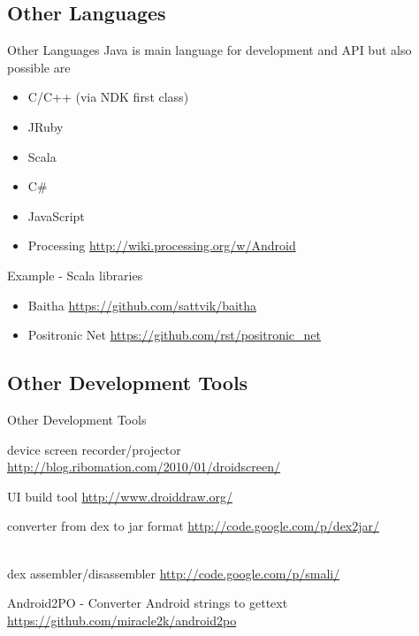 \documentclass[aspectratio=169]{beamer}
\newcommand{\surl}[1] {{\tiny \url{#1}}}
\begin{document}
  \subsection{Other Languages}
    \begin{frame}{Other Languages}
      Java is main language for development and API but also possible are 
      \begin{itemize}
      \item C/C++ (via NDK first class)
      \item JRuby
      \item Scala
      \item C\#
      \item JavaScript
      \item Processing \surl{http://wiki.processing.org/w/Android}
      \end{itemize}
    \end{frame}

    \begin{frame}{Example - Scala libraries}
      \begin{itemize}
       \item Baitha \surl{https://github.com/sattvik/baitha}
       \item Positronic Net \surl{https://github.com/rst/positronic_net}
      \end{itemize}
    \end{frame}

  \subsection{Other Development Tools}

    \begin{frame}{Other Development Tools}
      \begin{description}
        \item<1->[Droid at Screen] device screen recorder/projector \surl{http://blog.ribomation.com/2010/01/droidscreen/}

        \item<2->[DroidDraw] UI build tool \surl{http://www.droiddraw.org/}
 
        \item<3->[dex2jar] converter from dex to jar format \surl{http://code.google.com/p/dex2jar/}

        \item<4->[smali/baksmali] \hfill \\ dex assembler/disassembler \surl{http://code.google.com/p/smali/}

        \item<5->Android2PO - Converter Android strings to gettext \surl{https://github.com/miracle2k/android2po}
      \end{description}
   \end{frame}
\end{document}
